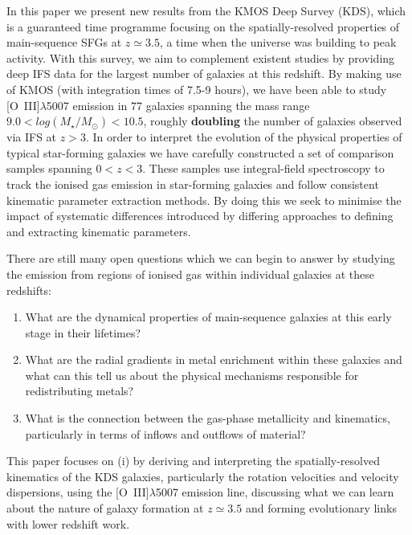\documentclass[fleqn,usenatbib]{mnras}
\begin{document}
In this paper we present new results from the KMOS Deep Survey (KDS), which is a guaranteed time programme focusing on the spatially-resolved properties of main-sequence SFGs at $z\simeq3.5$, a time when the universe was building to peak activity.
With this survey, we aim to complement existent studies by providing deep IFS data for the largest number of galaxies at this redshift.
By making use of KMOS (with integration times of 7.5-9 hours), we have been able to study [O~{\sc III}]$\lambda$5007 emission in 77 galaxies spanning the mass range $9.0 < log(M_{\star}/M_{\odot}) < 10.5$, roughly \textbf{doubling} the number of galaxies observed via IFS at $z > 3$.
In order to interpret the evolution of the physical properties of typical star-forming galaxies we have carefully constructed a set of comparison samples spanning $0 < z < 3$.
These samples use integral-field spectroscopy to track the ionised gas emission in star-forming galaxies and follow consistent kinematic parameter extraction methods.  
By doing this we seek to minimise the impact of systematic differences introduced by differing approaches to defining and extracting kinematic parameters.

There are still many open questions which we can begin to answer by studying the emission from regions of ionised gas within individual galaxies at these redshifts: 
\begin{enumerate}[label=(\roman*),align=left]
\item What are the dynamical properties of main-sequence galaxies at this early stage in their lifetimes?
\item  What are the radial gradients in metal enrichment within these galaxies and what can this tell us about the physical mechanisms responsible for redistributing metals?
\item What is the connection between the gas-phase metallicity and  kinematics, particularly in terms of inflows and outflows of material?
\end{enumerate}

This paper focuses on (i) by deriving and interpreting the spatially-resolved kinematics of the KDS galaxies, particularly the rotation velocities and velocity dispersions, using the [O~{\sc III}]$\lambda$5007 emission line, discussing what we can learn about the nature of galaxy formation at $z\simeq3.5$ and forming evolutionary links with lower redshift work. \\
\end{document}
